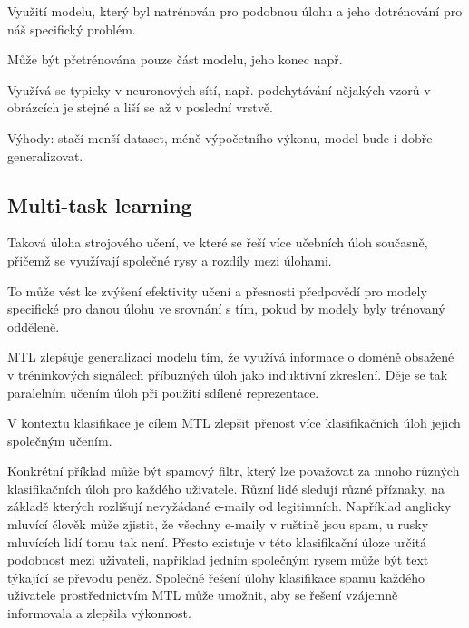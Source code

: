 \begin{compactitem}
    \item Využití modelu, který byl natrénován pro podobnou úlohu a jeho dotrénování pro náš specifický problém.
    \begin{compactitem}
        \item Může být přetrénována pouze část modelu, jeho konec např.
    \end{compactitem}

    \item Využívá se typicky v neuronových sítí, např. podchytávání nějakých vzorů v obrázcích je stejné a liší se až v poslední vrstvě.

    \item Výhody: stačí menší dataset, méně výpočetního výkonu, model bude i dobře generalizovat.
\end{compactitem}

\subsection{Multi-task learning}

\begin{compactitem}
    \item Taková úloha strojového učení, ve které se řeší více učebních úloh současně, přičemž se využívají společné rysy a rozdíly mezi úlohami.

    \item To může vést ke zvýšení efektivity učení a přesnosti předpovědí pro modely specifické pro danou úlohu ve srovnání s tím, pokud by modely byly trénovaný odděleně.

    \item MTL zlepšuje generalizaci modelu tím, že využívá informace o doméně obsažené v tréninkových signálech příbuzných úloh jako induktivní zkreslení. Děje se tak paralelním učením úloh při použití sdílené reprezentace.

    \item V kontextu klasifikace je cílem MTL zlepšit přenost více klasifikačních úloh jejich společným učením.
    \begin{compactitem}
        \item Konkrétní příklad může být spamový filtr, který lze považovat za mnoho různých klasifikačních úloh pro každého uživatele. Různí lidé sledují různé příznaky, na základě kterých rozlišují nevyžádané e-maily od legitimních. Například anglicky mluvící člověk může zjistit, že všechny e-maily v ruštině jsou spam, u rusky mluvících lidí tomu tak není. Přesto existuje v této klasifikační úloze určitá podobnost mezi uživateli, například jedním společným rysem může být text týkající se převodu peněz. Společné řešení úlohy klasifikace spamu každého uživatele prostřednictvím MTL může umožnit, aby se řešení vzájemně informovala a zlepšila výkonnost.
    \end{compactitem}
\end{compactitem}

